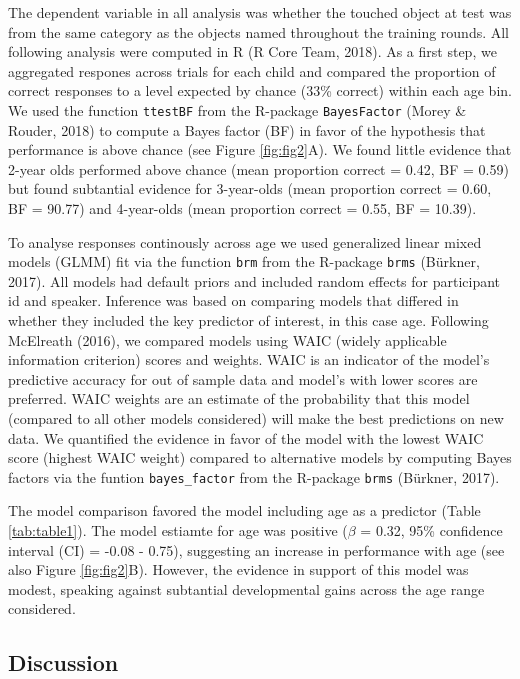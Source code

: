 \documentclass[man,floatsintext]{apa6}
\begin{document}
The dependent variable in all analysis was whether the touched object at
test was from the same category as the objects named throughout the
training rounds. All following analysis were computed in R (R Core Team,
2018). As a first step, we aggregated respones across trials for each
child and compared the proportion of correct responses to a level
expected by chance (33\% correct) within each age bin. We used the
function \texttt{ttestBF} from the R-package \texttt{BayesFactor} (Morey
\& Rouder, 2018) to compute a Bayes factor (BF) in favor of the
hypothesis that performance is above chance (see Figure
\ref{fig:fig2}A). We found little evidence that 2-year olds performed
above chance (mean proportion correct = 0.42, BF = 0.59) but found
subtantial evidence for 3-year-olds (mean proportion correct = 0.60, BF
= 90.77) and 4-year-olds (mean proportion correct = 0.55, BF = 10.39).

To analyse responses continously across age we used generalized linear
mixed models (GLMM) fit via the function \texttt{brm} from the R-package
\texttt{brms} (Bürkner, 2017). All models had default priors and
included random effects for participant id and speaker. Inference was
based on comparing models that differed in whether they included the key
predictor of interest, in this case age. Following McElreath (2016), we
compared models using WAIC (widely applicable information criterion)
scores and weights. WAIC is an indicator of the model's predictive
accuracy for out of sample data and model's with lower scores are
preferred. WAIC weights are an estimate of the probability that this
model (compared to all other models considered) will make the best
predictions on new data. We quantified the evidence in favor of the
model with the lowest WAIC score (highest WAIC weight) compared to
alternative models by computing Bayes factors via the funtion
\texttt{bayes\_factor} from the R-package \texttt{brms} (Bürkner, 2017).

The model comparison favored the model including age as a predictor
(Table \ref{tab:table1}). The model estiamte for age was positive
(\(\beta\) = 0.32, 95\% confidence interval (CI) = -0.08 - 0.75),
suggesting an increase in performance with age (see also Figure
\ref{fig:fig2}B). However, the evidence in support of this model was
modest, speaking against subtantial developmental gains across the age
range considered.

\subsection{Discussion}\label{discussion}
\end{document}
